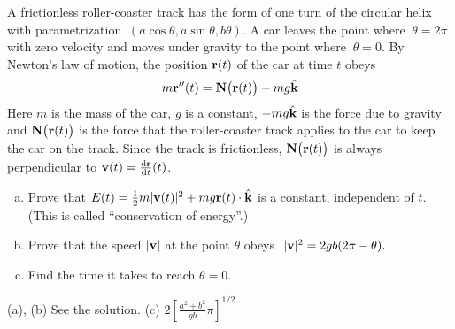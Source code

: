 \begin{question}
A frictionless roller-coaster track has the form of one turn of the circular
helix with parametrization $\ (a\cos\theta,a\sin\theta,b\theta).$ A car 
leaves the point where $\ \theta=2\pi\ $ with zero velocity and moves 
under gravity to the point where $\ \theta=0$. By Newton's law of motion, 
the position $\mathbf{r}(t)$ of the car at time $t$ obeys
\begin{equation*}
m \mathbf{r}''(t) = \mathbf{N}\big(\mathbf{r}(t)\big) - mg\hat{\mathbf{k}}
\end{equation*}
Here $m$ is the mass of the car, $g$ is a constant, $-mg\hat{\mathbf{k}}$ is the force
due to gravity and $\mathbf{N}\big(\mathbf{r}(t)\big)$ is the force that the roller-coaster
track applies to the car to keep the car on the track. Since the track
is frictionless, $\mathbf{N}\big(\mathbf{r}(t)\big)$ is always perpendicular 
to $\vv(t)=\diff{\vr}{t}(t)$. 
\begin{enumerate}[(a)]
\item
Prove that $E(t)=\tfrac{1}{2} m |\mathbf{v}(t)|^2 +mg \mathbf{r}(t)\cdot\hat{\mathbf{k}}$ is a
constant, independent of $t$. (This is called ``conservation of energy''.)
\item
Prove that the speed $|\mathbf{v}|$ at the point $\theta$ obeys 
$\ |\vv|^2=2gb(2\pi-\theta).$ 
\item Find the time it takes to reach $\theta=0$.
\end{enumerate}
\end{question}


\begin{answer}
(a), (b) See the solution.\qquad
(c) $2\left[\frac{a^2+b^2}{gb}\pi\right]^{1/2}$
\end{answer}

